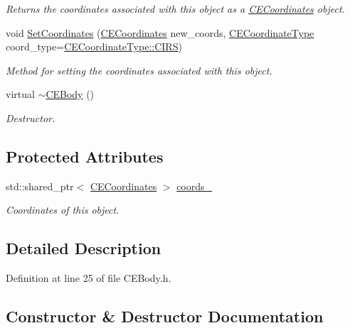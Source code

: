 \begin{DoxyCompactItemize}
\begin{DoxyCompactList}\small\item\em Returns the coordinates associated with this object as a \textquotesingle{}\hyperlink{class_c_e_coordinates}{C\+E\+Coordinates}\textquotesingle{} object. \end{DoxyCompactList}\item 
void \hyperlink{class_c_e_body_af94f3d5193c5dbc780d6d6193819d4b0}{Set\+Coordinates} (\hyperlink{class_c_e_coordinates}{C\+E\+Coordinates} new\+\_\+coords, \hyperlink{_c_e_coordinates_8h_a2198dc50406b64707964f5c1e8b32db2}{C\+E\+Coordinate\+Type} coord\+\_\+type=\hyperlink{_c_e_coordinates_8h_a2198dc50406b64707964f5c1e8b32db2a4efe390156f8c58bfa109575fc5cae4c}{C\+E\+Coordinate\+Type\+::\+C\+I\+R\+S})
\begin{DoxyCompactList}\small\item\em Method for setting the coordinates associated with this object. \end{DoxyCompactList}\item 
virtual \hyperlink{class_c_e_body_a28c9e7610a98aabf2d6eb8d06f7fa980}{$\sim$\+C\+E\+Body} ()
\begin{DoxyCompactList}\small\item\em Destructor. \end{DoxyCompactList}\end{DoxyCompactItemize}
\subsection*{Protected Attributes}
\begin{DoxyCompactItemize}
\item 
std\+::shared\+\_\+ptr$<$ \hyperlink{class_c_e_coordinates}{C\+E\+Coordinates} $>$ \hyperlink{class_c_e_body_ad054d987e2287cc5946fda179dc2dea4}{coords\+\_\+}
\begin{DoxyCompactList}\small\item\em Coordinates of this object. \end{DoxyCompactList}\end{DoxyCompactItemize}


\subsection{Detailed Description}


Definition at line 25 of file C\+E\+Body.\+h.



\subsection{Constructor \& Destructor Documentation}
\hypertarget{class_c_e_body_abd36081ccb5770d61e2da22e3f50d552}{}
